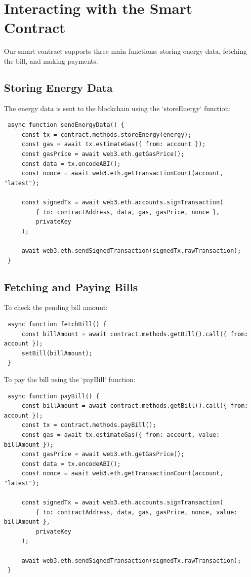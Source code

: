 \documentclass[a4paper,12pt]{report}
\begin{document}
 \section{Interacting with the Smart Contract}
 Our smart contract supports three main functions: storing energy data, fetching the bill, and making payments.
 
 \subsection{Storing Energy Data}
 The energy data is sent to the blockchain using the `storeEnergy` function:
 
 \begin{lstlisting}
 async function sendEnergyData() {
     const tx = contract.methods.storeEnergy(energy);
     const gas = await tx.estimateGas({ from: account });
     const gasPrice = await web3.eth.getGasPrice();
     const data = tx.encodeABI();
     const nonce = await web3.eth.getTransactionCount(account, "latest");
 
     const signedTx = await web3.eth.accounts.signTransaction(
         { to: contractAddress, data, gas, gasPrice, nonce },
         privateKey
     );
 
     await web3.eth.sendSignedTransaction(signedTx.rawTransaction);
 }
 \end{lstlisting}
 
 \subsection{Fetching and Paying Bills}
 To check the pending bill amount:
 
 \begin{lstlisting}
 async function fetchBill() {
     const billAmount = await contract.methods.getBill().call({ from: account });
     setBill(billAmount);
 }
 \end{lstlisting}
 
 To pay the bill using the `payBill` function:
 
 \begin{lstlisting}
 async function payBill() {
     const billAmount = await contract.methods.getBill().call({ from: account });
     const tx = contract.methods.payBill();
     const gas = await tx.estimateGas({ from: account, value: billAmount });
     const gasPrice = await web3.eth.getGasPrice();
     const data = tx.encodeABI();
     const nonce = await web3.eth.getTransactionCount(account, "latest");
 
     const signedTx = await web3.eth.accounts.signTransaction(
         { to: contractAddress, data, gas, gasPrice, nonce, value: billAmount },
         privateKey
     );
 
     await web3.eth.sendSignedTransaction(signedTx.rawTransaction);
 }
 \end{lstlisting}
 
\end{document}
